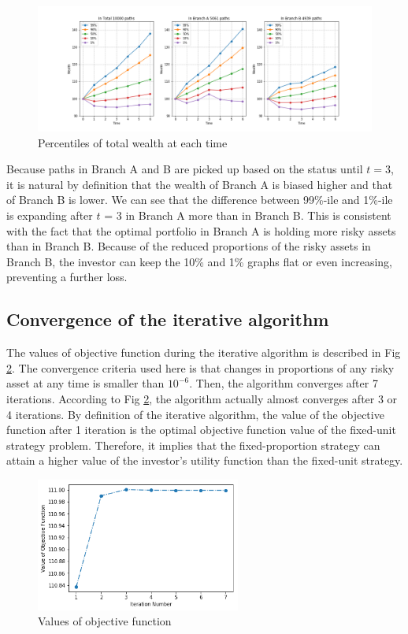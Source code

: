 \documentclass[11t]{article}
\begin{document}
\begin{figure}[htbp]
\begin{center}
\includegraphics[width=1.0\linewidth,clip]{wealth_percentile.png}
\caption{Percentiles of total wealth at each time}
\label{per}
\end{center}
\end{figure}

Because paths in Branch A and B are picked up based on the status until $t=3$,
it is natural by definition that the wealth of Branch A is biased higher and that of Branch B is lower.
We can see that the difference between 99\%-ile and 1\%-ile is expanding after $t$ = 3 in Branch A more than in Branch B.
This is consistent with the fact that the optimal portfolio in Branch A is holding more risky assets than in Branch B.
Because of the reduced proportions of the risky assets in Branch B, the investor can keep the 10\% and 1\% graphs flat or even increasing, preventing a further loss.

\subsection{Convergence of the iterative algorithm}
The values of objective function during the iterative algorithm is described in Fig \ref{conv}. The convergence criteria used here is that changes in proportions of any risky asset at any time is smaller than $10^{-6}$. Then, the algorithm converges after 7 iterations. According to Fig \ref{conv}, the algorithm actually almost converges after 3 or 4 iterations. By definition of the iterative algorithm, the value of the objective function after 1 iteration is the optimal objective function value of the fixed-unit strategy problem. Therefore, it implies that the fixed-proportion strategy can attain a higher value of the investor's utility function than the fixed-unit strategy.
\begin{figure}[htbp]
\centering
\includegraphics[width=0.6\textwidth]{conv.png}
\caption{Values of objective function}
\label{conv}
\end{figure}
\end{document}

